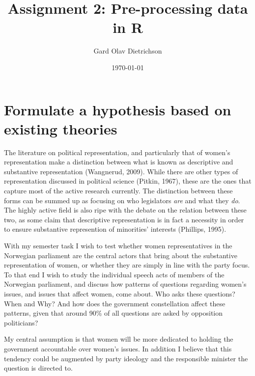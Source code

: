 \documentclass[12pt]{article}
\title{Assignment 2: Pre-processing data in R}
\author{Gard Olav Dietrichson}
\date{\today}
\begin{document}
	\maketitle
	
	\section{Formulate a hypothesis based on existing theories}
	The literature on political representation, and particularly that of women's representation make a distinction between what is known as descriptive and substantive representation (Wangnerud, 2009). While there are other types of representation discussed in political science (Pitkin, 1967), these are the ones that capture most of the active research currently. The distinction between these forms can be summed up as focusing on who legislators \textit{are} and what they \textit{do}. The highly active field is also ripe with the debate on the relation between these two, as some claim that descriptive representation is in fact a necessity in order to ensure substantive represention of minorities' interests (Phillips, 1995).
	
	With my semester task I wish to test whether women representatives in the Norwegian parliament are the central actors that bring about the substantive representation of women, or whether they are simply in line with the party focus. To that end I wish to study the individual speech acts of members of the Norwegian parliament, and discuss how patterns of questions regarding women's issues, and issues that affect women, come about. Who asks these questions? When and Why? And how does the government constellation affect these patterns, given that around 90\% of all questions are asked by opposition politicians?
	
	My central assumption is that women will be more dedicated to holding the government accountable over women's issues. In addition I believe that this tendency could be augmented by party ideology and the responsible minister the question is directed to. 
	
\end{document}
